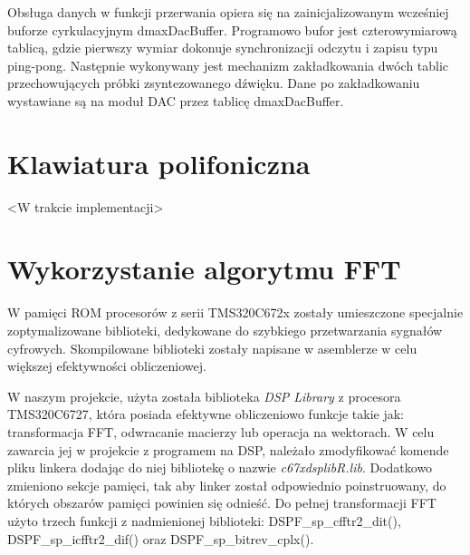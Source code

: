 Obsługa danych w funkcji przerwania opiera się na zainicjalizowanym wcześniej buforze cyrkulacyjnym dmaxDacBuffer. Programowo bufor jest czterowymiarową tablicą, gdzie pierwszy wymiar dokonuje synchronizacji odczytu i zapisu typu ping-pong. Następnie wykonywany jest mechanizm zakładkowania dwóch tablic przechowujących próbki zsyntezowanego dźwięku. Dane po zakładkowaniu wystawiane są na moduł DAC przez tablicę dmaxDacBuffer.

\section{Klawiatura polifoniczna}
<W trakcie implementacji>



\section{Wykorzystanie algorytmu FFT}


W pamięci ROM procesorów z serii TMS320C672x zostały umieszczone specjalnie zoptymalizowane biblioteki, dedykowane do szybkiego przetwarzania sygnałów cyfrowych. Skompilowane biblioteki zostały napisane w asemblerze w celu większej efektywności obliczeniowej. 

W naszym projekcie, użyta została biblioteka \emph{DSP Library} z procesora TMS320C6727, która posiada efektywne obliczeniowo funkcje takie jak: transformacja FFT, odwracanie macierzy lub operacja na wektorach. W celu zawarcia jej w projekcie z programem na DSP, należało zmodyfikować komende pliku linkera dodając do niej bibliotekę o nazwie \emph{c67xdsplibR.lib}. Dodatkowo zmieniono sekcje pamięci, tak aby linker został odpowiednio poinstruowany, do których obszarów pamięci powinien się odnieść. Do pełnej transformacji FFT użyto trzech funkcji z nadmienionej biblioteki: DSPF\_sp\_cfftr2\_dit(), DSPF\_sp\_icfftr2\_dif() oraz DSPF\_sp\_bitrev\_cplx().

